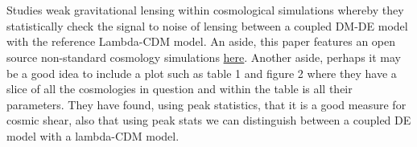 \documentclass[fleqn,usenatbib]{mnras}
\begin{document}
\section{\citet{Giocoli_18}}
Studies weak gravitational lensing within cosmological simulations whereby they statistically check the signal to noise of lensing between a coupled DM-DE model with the reference Lambda-CDM model. An aside, this paper features an open source non-standard cosmology simulations \href{http://www.marcobaldi.it/web/CoDECS_summary.html}{here}. Another aside, perhaps it may be a good idea to include a plot such as table 1 and figure 2 where they have a slice of all the cosmologies in question and within the table is all their parameters. They have found, using peak statistics, that it is a good measure for cosmic shear, also that using peak stats we can distinguish between a coupled DE model with a lambda-CDM model.



 




\bsp	%
\label{lastpage}
\end{document}
